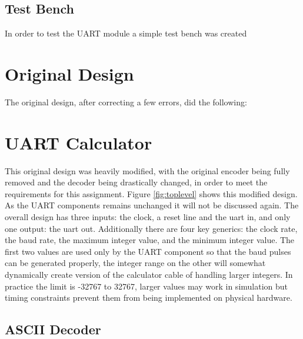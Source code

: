 \documentclass[11pt]{article}
\begin{document}
\subsection{Test Bench}
In order to test the UART module a simple test bench was created

\section{Original Design}
The original design, after correcting a few errors, did the following:

\section{UART Calculator}
This original design was heavily modified, with the original encoder being fully removed and the decoder being drastically changed, in order to meet the requirements for this assignment.
Figure \ref{fig:toplevel} shows this modified design.
As the UART components remains unchanged it will not be discussed again.
The overall design has three inputs: the clock, a reset line and the uart in, and only one output: the uart out.
Additionally there are four key generics: the clock rate, the baud rate, the maximum integer value, and the minimum integer value.
The first two values are used only by the UART component so that the baud pulses can be generated properly,
the integer range on the other will somewhat dynamically create version of the calculator cable of handling larger integers.
In practice the limit is -32767 to 32767, larger values may work in simulation but timing constraints prevent them from being implemented on physical hardware.


\subsection{ASCII Decoder}
\end{document}

